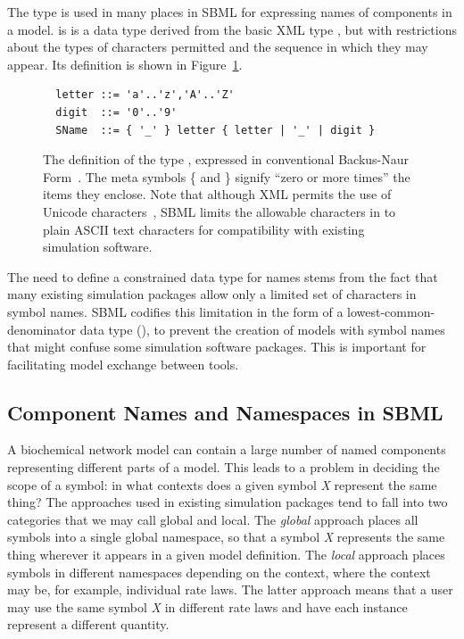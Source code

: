 \documentclass[10pt]{cekarticle}
\newcommand{\vref}[1]{\ref{#1}}
\begin{document}
The type  is used in many places in SBML for expressing names
of components in a model.   is is a data type derived from the
basic XML type , but with restrictions about the types of
characters permitted and the sequence in which they may appear.  Its 
definition is shown in Figure~\vref{fig:name}.

\begin{figure}[th]
  \vspace*{10pt}
  \centering
  \begin{minipage}{3.8in}
\begin{verbatim}
  letter ::= 'a'..'z','A'..'Z'
  digit  ::= '0'..'9'
  SName  ::= { '_' } letter { letter | '_' | digit }
\end{verbatim}
  \end{minipage}
  \caption{The definition of the type , expressed in conventional
    Backus-Naur Form~\protect\citep{naur:1960}.  The meta symbols \{ and \} signify
    ``zero or more times'' the items they enclose.  Note that although XML
    permits the use of Unicode characters~\protect\citep{unicode:1996}, SBML
    limits the allowable characters in  to plain ASCII text
    characters for compatibility with existing simulation software.}
  \label{fig:name}
\end{figure}    

The need to define a constrained data type for names stems from the fact
that many existing simulation packages allow only a limited set of
characters in symbol names.  SBML codifies this limitation in the form of a
lowest-common-denominator data type (), to prevent the
creation of models with symbol names that might confuse some simulation
software packages.  This is important for facilitating model exchange
between tools.


\subsection{Component Names and Namespaces in SBML}
\label{sec:namespaces}

A biochemical network model can contain a large number of named components
representing different parts of a model.  This leads to a problem in
deciding the scope of a symbol: in what contexts does a given symbol
\emph{X} represent the same thing?  The approaches used in existing
simulation packages tend to fall into two categories that we may call
global and local.  The \emph{global} approach places all symbols into a
single global namespace, so that a symbol \emph{X} represents the same
thing wherever it appears in a given model definition.  The \emph{local}
approach places symbols in different namespaces depending on the context,
where the context may be, for example, individual rate laws.  The latter
approach means that a user may use the same symbol \emph{X} in different
rate laws and have each instance represent a different quantity.
\end{document}
